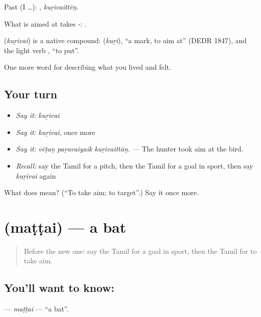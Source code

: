 Past (I …): , \emph{kuṟivaittēṉ}.

What is aimed at takes -:  .

\begin{cousinweb}
\textbf{} (\emph{kuṟivai}) is a native compound:  (\emph{kuṟi}), \textquotedblleft{}a mark, to aim at\textquotedblright{} (DEDR 1847), and the light verb , \textquotedblleft{}to put\textquotedblright{}.
\end{cousinweb}

\begin{grammarlens}[title={What you've built}]
One more word for describing what you lived and felt.
\end{grammarlens}

\subsection*{Your turn}
\begin{itemize}
\raggedright
  \item \emph{Say it:} \emph{kuṟivai}
  \item \emph{Say it:} \emph{kuṟivai}, once more
  \item \emph{Say it:} \emph{vēṭaṉ paṟavaiyaik kuṟivaittāṉ.} — The hunter took aim at the bird.
  \item \emph{Recall:} say the Tamil for a pitch, then the Tamil for a goal in sport, then say \emph{kuṟivai} again
\end{itemize}

\begin{tcolorbox}[breakable,colback=teal!4,colframe=teal!35!black,title={Before you move on}]
What does  mean? (\textquotedblleft{}To take aim; to target\textquotedblright{}.) Say it once more.
\end{tcolorbox}
\section[\texorpdfstring{\ta{மட்டை} (maṭṭai)}{மட்டை (maṭṭai)}]{ (maṭṭai) — a bat}

\label{lesson:TA-C535-mattai}



\begin{quote}
Before the new one: say the Tamil for a goal in sport, then the Tamil for to take aim.
\end{quote}

\subsection*{You'll want to know: }
\textbf{} — \emph{maṭṭai} — \textquotedblleft{}a bat\textquotedblright{}.

